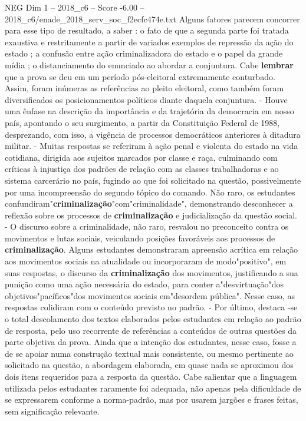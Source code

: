 \begin{textsample}{NEG Dim 1 – 2018\_c6 – Score -6.00 – 2018\_c6/enade\_2018\_serv\_soc\_f2ecfc474e.txt}
Alguns fatores parecem concorrer para esse tipo de resultado, a saber : o fato de que a segunda parte foi tratada exaustiva e restritamente a partir de variados exemplos de repressão da ação do estado ; a confusão entre ação criminalizadora do estado e o papel da grande mídia ; o distanciamento do enunciado ao abordar a conjuntura.
Cabe \textbf{lembrar} que a prova se deu em um período pós-eleitoral extremamente conturbado.
Assim, foram inúmeras as referências ao pleito eleitoral, como também foram diversificados os posicionamentos políticos diante daquela conjuntura. - Houve uma ênfase na descrição da importância e da trajetória da democracia em nosso país, apontando o seu surgimento, a partir da Constituição Federal de 1988, desprezando, com isso, a vigência de processos democráticos anteriores à ditadura militar. - Muitas respostas se referiram à ação penal e violenta do estado na vida cotidiana, dirigida aos sujeitos marcados por classe e raça, culminando com críticas à injustiça dos padrões de relação com as classes trabalhadoras e ao sistema carcerário no país, fugindo ao que foi solicitado na questão, possivelmente por uma incompreensão do segundo tópico do comando.
Não raro, os estudantes confundiram"\textbf{criminalização}"com"criminalidade", demonstrando desconhecer a reflexão sobre os processos de \textbf{criminalização} e judicialização da questão social. - O discurso sobre a criminalidade, não raro, resvalou no preconceito contra os movimentos e lutas sociais, veiculando posições favoráveis aos processos de \textbf{criminalização}.
Alguns estudantes demonstraram apreensão acrítica em relação aos movimentos sociais na atualidade ou incorporaram de modo"positivo", em suas respostas, o discurso da \textbf{criminalização} dos movimentos, justificando a sua punição como uma ação necessária do estado, para conter a"desvirtuação"dos objetivos"pacíficos"dos movimentos sociais em"desordem pública".
Nesse caso, as respostas colidiram com o conteúdo previsto no padrão. - Por último, destaca -se o total descolamento dos textos elaborados pelos estudantes em relação ao padrão de resposta, pelo uso recorrente de referências a conteúdos de outras questões da parte objetiva da prova.
Ainda que a intenção dos estudantes, nesse caso, fosse a de se apoiar numa construção textual mais consistente, ou mesmo pertinente ao solicitado na questão, a abordagem elaborada, em quase nada se aproximou dos dois itens requeridos para a resposta da questão.
Cabe salientar que a linguagem utilizada pelos estudantes raramente foi adequada, não apenas pela dificuldade de se expressarem conforme a norma-padrão, mas por usarem jargões e frases feitas, sem significação relevante.

\end{textsample}
